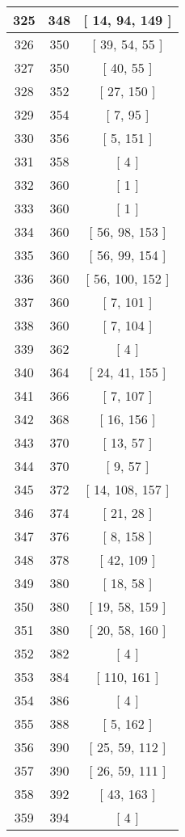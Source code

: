 \begin{center}
\begin{longtable}[H]{|| c c c ||}
\hline
325 & 348 & [ 14, 94, 149 ] \\ 
\hline
326 & 350 & [ 39, 54, 55 ] \\ 
\hline
327 & 350 & [ 40, 55 ] \\ 
\hline
328 & 352 & [ 27, 150 ] \\ 
\hline
329 & 354 & [ 7, 95 ] \\ 
\hline
330 & 356 & [ 5, 151 ] \\ 
\hline
331 & 358 & [ 4 ] \\ 
\hline
332 & 360 & [ 1 ] \\ 
\hline
333 & 360 & [ 1 ] \\ 
\hline
334 & 360 & [ 56, 98, 153 ] \\ 
\hline
335 & 360 & [ 56, 99, 154 ] \\ 
\hline
336 & 360 & [ 56, 100, 152 ] \\ 
\hline
337 & 360 & [ 7, 101 ] \\ 
\hline
338 & 360 & [ 7, 104 ] \\ 
\hline
339 & 362 & [ 4 ] \\ 
\hline
340 & 364 & [ 24, 41, 155 ] \\ 
\hline
341 & 366 & [ 7, 107 ] \\ 
\hline
342 & 368 & [ 16, 156 ] \\ 
\hline
343 & 370 & [ 13, 57 ] \\ 
\hline
344 & 370 & [ 9, 57 ] \\ 
\hline
345 & 372 & [ 14, 108, 157 ] \\ 
\hline
346 & 374 & [ 21, 28 ] \\ 
\hline
347 & 376 & [ 8, 158 ] \\ 
\hline
348 & 378 & [ 42, 109 ] \\ 
\hline
349 & 380 & [ 18, 58 ] \\ 
\hline
350 & 380 & [ 19, 58, 159 ] \\ 
\hline
351 & 380 & [ 20, 58, 160 ] \\ 
\hline
352 & 382 & [ 4 ] \\ 
\hline
353 & 384 & [ 110, 161 ] \\ 
\hline
354 & 386 & [ 4 ] \\ 
\hline
355 & 388 & [ 5, 162 ] \\ 
\hline
356 & 390 & [ 25, 59, 112 ] \\ 
\hline
357 & 390 & [ 26, 59, 111 ] \\ 
\hline
358 & 392 & [ 43, 163 ] \\ 
\hline
359 & 394 & [ 4 ] \\ 

\end{longtable}
\end{center}
